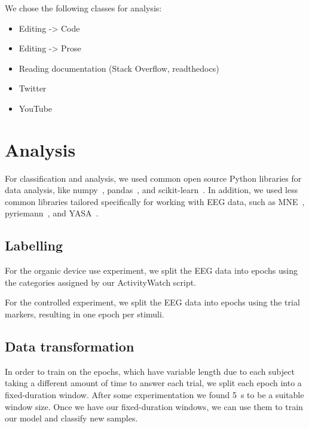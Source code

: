We chose the following classes for analysis:

\begin{itemize}
        \item Editing -> Code
        \item Editing -> Prose
        \item Reading documentation (Stack Overflow, readthedocs)
        \item Twitter
        \item YouTube
\end{itemize}

\vfill
\pagebreak
\section{Analysis}

    For classification and analysis, we used common open source Python libraries for data analysis, like numpy~\cite{harris2020array}, pandas~\cite{reback2020pandas}, and scikit-learn~\cite{scikit-learn}. In addition, we used less common libraries tailored specifically for working with EEG data, such as MNE~\cite{noauthor_mne-python_2020}, pyriemann~\cite{alexandre_barachant_2020_3715511}, and YASA~\cite{vallat_yasa_2020}.

    \subsection{Labelling}
        For the organic device use experiment, we split the EEG data into epochs using the categories assigned by our ActivityWatch script.

        For the controlled experiment, we split the EEG data into epochs using the trial markers, resulting in one epoch per stimuli.


    \subsection{Data transformation}\label{section:transform}

        In order to train on the epochs, which have variable length due to each subject taking a different amount of time to answer each trial, we split each epoch into a fixed-duration window. After some experimentation we found \SI{5}{\second} to be a suitable window size. Once we have our fixed-duration windows, we can use them to train our model and classify new samples.

